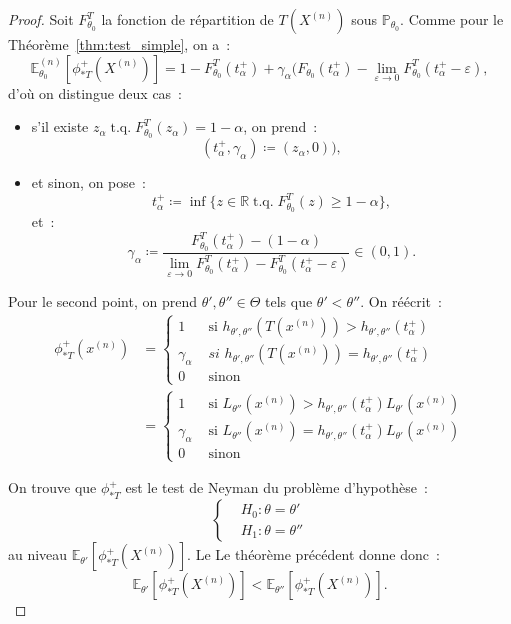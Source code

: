 \documentclass{report}
\DeclareMathOperator{\tq}{\text{ t.q. }}
\renewcommand{\P}{\mathbb P}
\newcommand{\E}{\mathbb E}
\newcommand{\R}{\mathbb R}
\newcommand{\n}{{(n)}}
\newcommand{\Xn}{{X^\n}}
\theoremstyle{definition}
\theoremstyle{remark}
\begin{document}
		\begin{proof} Soit $F_{\theta_0}^T$ la fonction de répartition de $T(X^\n)$ sous $\P_{\theta_0}$. Comme pour le Théorème~\ref{thm:test_simple}, on a~:
		\[\E_{\theta_0}^\n[\phi_{*T}^+(X^\n)] =
			1 - F_{\theta_0}^T(t_\alpha^+) + \gamma_\alpha(F_{\theta_0}(t_\alpha^+)-\lim_{\varepsilon \to 0}F_{\theta_0}^T(t_\alpha^+ - \varepsilon),\]
		d'où on distingue deux cas~:
		\begin{itemize}
			\item s'il existe $z_\alpha \tq F_{\theta_0}^T(z_\alpha) = 1 - \alpha$, on prend~:
			\[(t_\alpha^+, \gamma_\alpha) \coloneqq (z_\alpha, 0)),\]
			\item et sinon, on pose~:
			\[t_\alpha^+ \coloneqq \inf\{z \in \R \tq F_{\theta_0}^T(z) \geq 1-\alpha\},\]
			et~:
			\[\gamma_\alpha \coloneqq \frac {F_{\theta_0}^T(t_\alpha^+)
				- (1-\alpha)}{\lim_{\varepsilon \to 0}F_{\theta_0}^T(t_\alpha^+) - F_{\theta_0}^T(t_\alpha^+ - \varepsilon)} \in (0, 1).\]
		\end{itemize}

		Pour le second point, on prend $\theta', \theta'' \in \Theta$ tels que $\theta' < \theta''$. On réécrit~:
		\begin{align*}
			\phi_{*T}^+(x^\n) &=
			\begin{cases}
				1 &\text{ si } h_{\theta',\theta''}(T(x^\n)) > h_{\theta',\theta''}(t_\alpha^+) \\
				\gamma_\alpha &\textit{ si } h_{\theta', \theta''}(T(x^\n)) = h_{\theta',\theta''}(t_\alpha^+) \\
				0 &\text{ sinon}
			\end{cases} \\
			&=
			\begin{cases}
				1 &\text{ si } L_{\theta''}(x^\n) > h_{\theta',\theta''}(t_\alpha^+)L_{\theta'}(x^\n) \\
				\gamma_\alpha & \text{ si } L_{\theta''}(x^\n) = h_{\theta',\theta''}(t_\alpha^+)L_{\theta'}(x^\n) \\
				0 &\text{ sinon}
			\end{cases}
		\end{align*}

		On trouve que $\phi_{*T}^+$ est le test de Neyman du problème d'hypothèse~:
		\[\begin{cases}
			&H_0 : \theta = \theta' \\
			&H_1 : \theta = \theta''
		\end{cases}\]
		au niveau $\E_{\theta'}[\phi_{*T}^+(\Xn)]$. Le Le théorème précédent donne donc~:
		\[\E_{\theta'}[\phi_{*T}^+(\Xn)] < \E_{\theta''}[\phi_{*T}^+(\Xn)].\]


\end{proof}
\end{document}
